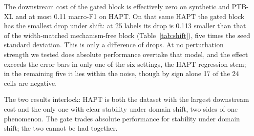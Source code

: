 The downstream cost of the gated block is effectively zero on synthetic and PTB-XL and at most 0.11 macro-F1 on HAPT. On that same HAPT the gated block has the smallest drop under shift: at 25 labels its drop is 0.113 smaller than that of the width-matched mechanism-free block (Table~\ref{tab:shift}), five times the seed standard deviation. This is only a difference of drops. At no perturbation strength we tested does absolute performance overtake that model, and the effect exceeds the error bars in only one of the six settings, the HAPT regression stem; in the remaining five it lies within the noise, though by sign alone 17 of the 24 cells are negative.

The two results interlock: HAPT is both the dataset with the largest downstream cost and the only one with clear stability under domain shift, two sides of one phenomenon. The gate trades absolute performance for stability under domain shift; the two cannot be had together.

